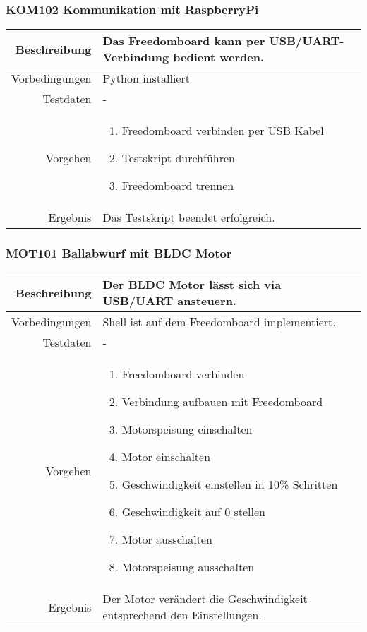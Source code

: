 \subsubsection{KOM102 Kommunikation mit RaspberryPi}
\begin{table}[h!]
	\renewcommand{\arraystretch}{1.5}
	\begin{tabular}{|r|p{13cm}|}
		\hline Beschreibung	&
			Das Freedomboard kann per USB/UART-Verbindung bedient werden. \\ 
		\hline Vorbedingungen	& Python installiert \\ 
		\hline Testdaten	& - \\ 
		\hline Vorgehen		& 
		\begin{enumerate}
			\item Freedomboard verbinden per USB Kabel
			\item Testskript durchführen
			\item Freedomboard trennen
		\end{enumerate} \\ 
		\hline Ergebnis 	&
			Das Testskript beendet erfolgreich.\\ 
		\hline 
	\end{tabular}
\end{table}

\newpage
\subsubsection{MOT101 Ballabwurf mit BLDC Motor}
\begin{table}[h!]
	\renewcommand{\arraystretch}{1.5}
	\begin{tabular}{|r|p{13cm}|}
		\hline Beschreibung	& Der BLDC Motor lässt sich via USB/UART ansteuern. \\ 
		\hline Vorbedingungen	& Shell ist auf dem Freedomboard implementiert. \\ 
		\hline Testdaten	& - \\ 
		\hline Vorgehen		& 
		\begin{enumerate}
			\item Freedomboard verbinden
			\item Verbindung aufbauen mit Freedomboard
			\item Motorspeisung einschalten
			\item Motor einschalten
			\item Geschwindigkeit einstellen in 10\% Schritten
			\item Geschwindigkeit auf 0 stellen
			\item Motor ausschalten
			\item Motorspeisung ausschalten 
		\end{enumerate} \\ 
		\hline Ergebnis 	&
			Der Motor verändert die Geschwindigkeit entsprechend
			den Einstellungen.\\ 
		\hline 
	\end{tabular}
\end{table}

